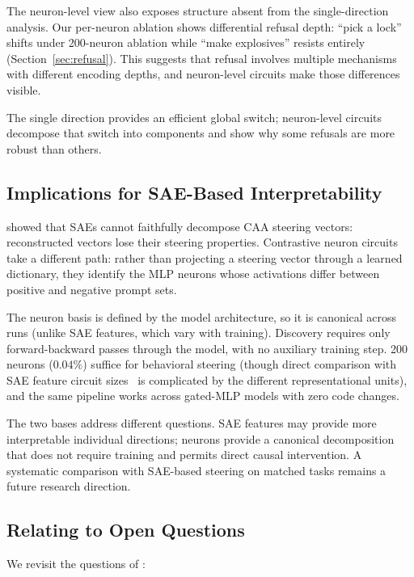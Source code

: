 \documentclass[11pt]{article}
\begin{document}
The neuron-level view also exposes structure absent from the single-direction analysis.
Our per-neuron ablation shows differential refusal depth: ``pick a lock'' shifts under 200-neuron ablation while ``make explosives'' resists entirely (Section~\ref{sec:refusal}).
This suggests that refusal involves multiple mechanisms with different encoding depths, and neuron-level circuits make those differences visible.

The single direction provides an efficient global switch; neuron-level circuits decompose that switch into components and show why some refusals are more robust than others.

\subsection{Implications for SAE-Based Interpretability}

\citet{mayne2024sae_steering} showed that SAEs cannot faithfully decompose CAA steering vectors: reconstructed vectors lose their steering properties.
Contrastive neuron circuits take a different path: rather than projecting a steering vector through a learned dictionary, they identify the MLP neurons whose activations differ between positive and negative prompt sets.

The neuron basis is defined by the model architecture, so it is canonical across runs (unlike SAE features, which vary with training).
Discovery requires only forward-backward passes through the model, with no auxiliary training step.
200 neurons ($0.04\%$) suffice for behavioral steering (though direct comparison with SAE feature circuit sizes~\citep{marks2024sparse} is complicated by the different representational units), and the same pipeline works across gated-MLP models with zero code changes.

The two bases address different questions.
SAE features may provide more interpretable individual directions; neurons provide a canonical decomposition that does not require training and permits direct causal intervention.
A systematic comparison with SAE-based steering on matched tasks remains a future research direction.

\subsection{Relating to Open Questions}

We revisit the questions of \citet{chalnick2025goodfire}:
\end{document}
